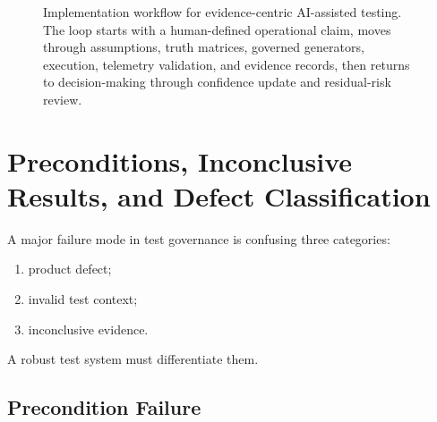 \documentclass[11pt,a4paper]{article}
\begin{document}
\begin{figure}[H]
\centering
{}
\caption{Implementation workflow for evidence-centric AI-assisted testing. The loop starts with a human-defined operational claim, moves through assumptions, truth matrices, governed generators, execution, telemetry validation, and evidence records, then returns to decision-making through confidence update and residual-risk review.}
\end{figure}

\section{Preconditions, Inconclusive Results, and Defect Classification}

A major failure mode in test governance is confusing three categories:
\begin{enumerate}
\item product defect;
\item invalid test context;
\item inconclusive evidence.
\end{enumerate}

A robust test system must differentiate them.

\subsection{Precondition Failure}
\end{document}
